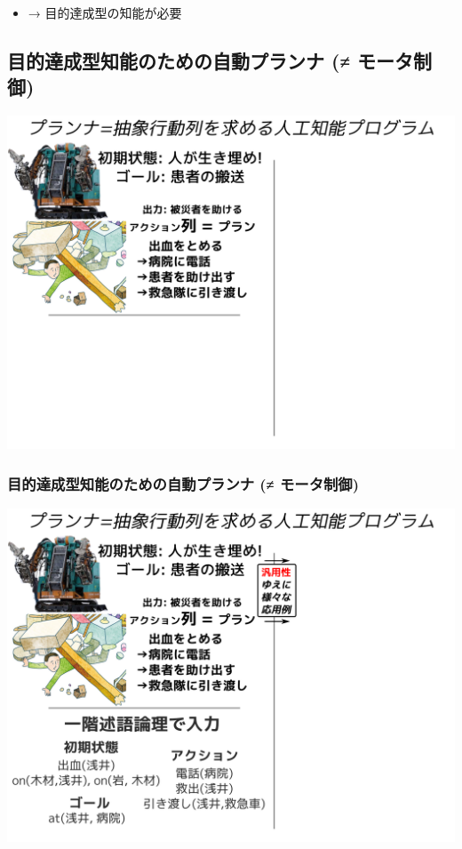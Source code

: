 \begin{alignright}
\begin{xlarge}
\begin{itemize}
\item → 目的達成型の知能が必要
\end{itemize}
\end{xlarge}
\end{alignright}

\subsection{目的達成型知能のための自動プランナ (≠ モータ制御)}
\label{sec:orgheadline17}

\includegraphics{img/planning/1.png}

\subsubsection{目的達成型知能のための自動プランナ (≠ モータ制御)}
\label{sec:orgheadline15}

\includegraphics{img/planning/2.png}

